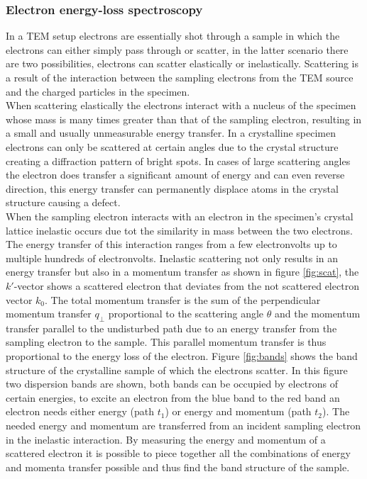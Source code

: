 \subsubsection{Electron energy-loss spectroscopy}
In a TEM setup electrons are essentially shot through a sample in which the electrons can either simply pass through or scatter, in the latter scenario there are two possibilities, electrons can scatter elastically or inelastically.
Scattering is a result of the interaction between the sampling electrons from the TEM source and the charged particles in the specimen.\\
When scattering elastically the electrons interact with a nucleus of the specimen whose mass is many times greater than that of the sampling electron, resulting in a small and usually unmeasurable energy transfer.
In a crystalline specimen electrons can only be scattered at certain angles due to the crystal structure creating a diffraction pattern of bright spots. In cases of large scattering angles the electron does transfer a significant amount of energy and can even reverse direction, this energy transfer can permanently displace atoms in the crystal structure causing a defect.\cite{Egerton_2008}\\
When the sampling electron interacts with an electron in the specimen's crystal lattice inelastic occurs due tot the similarity in mass between the two electrons. The energy transfer of this interaction ranges from a few electronvolts up to multiple hundreds of electronvolts.
Inelastic scattering not only results in an energy transfer but also in a momentum transfer as shown in figure \ref{fig:scat}, the $k'$-vector shows a scattered electron that deviates from the not scattered electron vector $k_0$.
The total momentum transfer is the sum of the perpendicular momentum transfer $q_{\perp}$ proportional to the scattering angle $\theta$ and the momentum transfer parallel to the undisturbed path due to an energy transfer from the sampling electron to the sample. This parallel momentum transfer is thus proportional to the energy loss of the electron.
Figure \ref{fig:bands} shows the band structure of the crystalline sample of which the electrons scatter. In this figure two dispersion bands are shown, both bands can be occupied by electrons of certain energies, to excite an electron from the blue band to the red band an electron needs either energy (path $t_1$) or energy and momentum (path $t_2$).
The needed energy and momentum are transferred from an incident sampling electron in the inelastic interaction. By measuring the energy and momentum of a scattered electron it is possible to piece together all the combinations of energy and momenta transfer possible and thus find the band structure of the sample.\\
